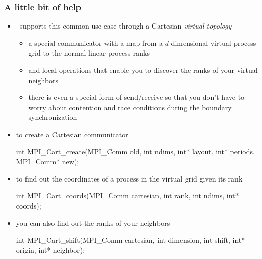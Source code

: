 \begin{frame}[fragile]
%
  \frametitle{A little bit of help}
%
  \begin{itemize}
%
  \item \mpi\ supports this common use case through a Cartesian {\em virtual topology}
    \begin{itemize}
    \item a special communicator with a map from a $d$-dimensional virtual process grid to the
      normal linear process ranks
    \item and local operations that enable you to discover the ranks of your virtual neighbors
    \item there is even a special form of send/receive so that you don't have to worry about
      contention and race conditions during the boundary synchronization
    \end{itemize}
%
  \item to create a Cartesian communicator
    \begin{C}
int MPI_Cart_create(MPI_Comm old,
        int ndims, int* layout, int* periods, MPI_Comm* new);
    \end{C}
%
  \item to find out the coordinates of a process in the virtual grid given its rank
    \begin{C}
int MPI_Cart_coords(MPI_Comm cartesian,
        int rank, int ndims, int* coords); 
    \end{C}
%
    \item you can also find out the ranks of your neighbors
    \begin{C}
int MPI_Cart_shift(MPI_Comm cartesian,
        int dimension, int shift, int* origin, int* neighbor); 
    \end{C}
%
  \end{itemize}
%
\end{frame}


